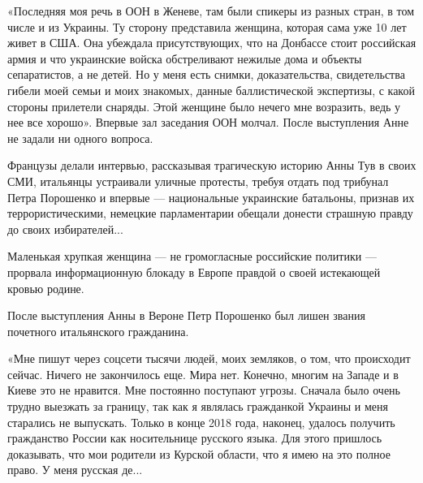 «Последняя моя речь в ООН в Женеве, там были спикеры из разных стран, в том числе и из Украины. Ту сторону представила женщина, которая сама уже 10 лет живет в США. Она убеждала присутствующих, что на Донбассе стоит российская армия и что украинские войска обстреливают нежилые дома и объекты сепаратистов, а не детей. Но у меня есть снимки, доказательства, свидетельства гибели моей семьи и моих знакомых, данные баллистической экспертизы, с какой стороны прилетели снаряды. Этой женщине было нечего мне возразить, ведь у нее все хорошо».
Впервые зал заседания ООН молчал. После выступления Анне не задали ни одного вопроса.

Французы делали интервью, рассказывая трагическую историю Анны Тув в своих СМИ,
итальянцы устраивали уличные протесты, требуя отдать под трибунал Петра
Порошенко и впервые — национальные украинские батальоны, признав их
террористическими, немецкие парламентарии обещали донести страшную правду до
своих избирателей...

Маленькая хрупкая женщина — не громогласные российские политики — прорвала
информационную блокаду в Европе правдой о своей истекающей кровью родине.

После выступления Анны в Вероне Петр Порошенко был лишен звания почетного итальянского гражданина.

«Мне пишут через соцсети тысячи людей, моих земляков, о том, что происходит
сейчас. Ничего не закончилось еще. Мира нет. Конечно, многим на Западе и в
Киеве это не нравится. Мне постоянно поступают угрозы. Сначала было очень
трудно выезжать за границу, так как я являлась гражданкой Украины и меня
старались не выпускать. Только в конце 2018 года, наконец, удалось получить
гражданство России как носительнице русского языка. Для этого пришлось
доказывать, что мои родители из Курской области, что я имею на это полное
право. У меня русская де...

